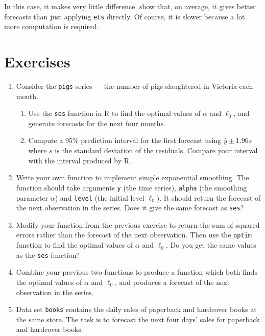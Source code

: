 \documentclass[]{book}
\providecommand{\tightlist}{%
  \setlength{\itemsep}{0pt}\setlength{\parskip}{0pt}}
\begin{document}
In this case, it makes very little difference. \citet{baggedETS} show that, on average, it gives better forecasts than just applying \texttt{ets} directly. Of course, it is slower because a lot more computation is required.

\hypertarget{exercises-2}{%
\section{Exercises}\label{exercises-2}}

\begin{enumerate}
\def\labelenumi{\arabic{enumi}.}
\item
  Consider the \texttt{pigs} series --- the number of pigs slaughtered in Victoria each month.

  \begin{enumerate}
  \def\labelenumii{\alph{enumii}.}
  \tightlist
  \item
    Use the \texttt{ses} function in R to find the optimal values of \(\alpha\) and \(\ell_0\), and generate forecasts for the next four months.
  \item
    Compute a 95\% prediction interval for the first forecast using \(\hat{y} \pm 1.96s\) where \(s\) is the standard deviation of the residuals. Compare your interval with the interval produced by R.
  \end{enumerate}
\item
  Write your own function to implement simple exponential smoothing. The function should take arguments \texttt{y} (the time series), \texttt{alpha} (the smoothing parameter \(\alpha\)) and \texttt{level} (the initial level \(\ell_0\)). It should return the forecast of the next observation in the series. Does it give the same forecast as \texttt{ses}?
\item
  Modify your function from the previous exercise to return the sum of squared errors rather than the forecast of the next observation. Then use the \texttt{optim} function to find the optimal values of \(\alpha\) and \(\ell_0\). Do you get the same values as the \texttt{ses} function?
\item
  Combine your previous two functions to produce a function which both finds the optimal values of \(\alpha\) and \(\ell_0\), and produces a forecast of the next observation in the series.
\item
  Data set \texttt{books} contains the daily sales of paperback and
  hardcover books at the same store. The task is to forecast the next four
  days' sales for paperback and hardcover books.


\end{enumerate}
\end{document}
